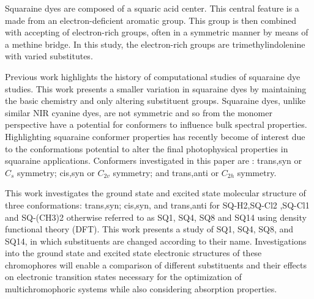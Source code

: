 \documentclass[journal=jacsat,manuscript=article]{achemso}
\begin{document}
Squaraine dyes are composed of a squaric acid center. This central feature is a made from an electron-deficient aromatic group. This group is then combined with accepting of electron-rich groups, often in a symmetric manner by means of a methine bridge\cite{Ilina2020SquaraineChallenges}⁠. In this study, the electron-rich groups are trimethylindolenine with varied substitutes.

Previous work\cite{Bassal2017ExploringADC2}⁠ highlights the history of computational studies of squaraine dye studies. This work presents a smaller variation in squaraine dyes by maintaining the basic chemistry and only altering substituent groups. Squaraine dyes, unlike similar NIR cyanine dyes, are not symmetric and so from the monomer perspective have a potential for conformers to influence bulk spectral properties\cite{Kolosova2018MolecularSquaraines}. Highlighting squaraine conformer properties has recently become of interest due to the conformations potential to alter the final photophysical properties in squaraine applications\citep{Paterno2018ExcitedScenario}. Conformers investigated in this paper are : trans,syn or $C_{s}$ symmetry; cis,syn or $C_{2v}$ symmetry; and trans,anti or $C_{2h}$ symmetry.

This work investigates the ground state and excited state molecular structure of three conformations: trans,syn; cis,syn, and trans,anti for SQ-H2,SQ-Cl2 ,SQ-Cl1 and SQ-(CH3)2 otherwise referred to as SQ1, SQ4, SQ8 and SQ14 using density functional theory (DFT). This work presents a study of SQ1, SQ4, SQ8, and SQ14, in which substituents are changed according to their name. Investigations into the ground state and excited state electronic structures of these chromophores will enable a comparison of different substituents and their effects on electronic transition states necessary for the optimization of multichromophoric systems while also considering absorption properties.  
\end{document}
